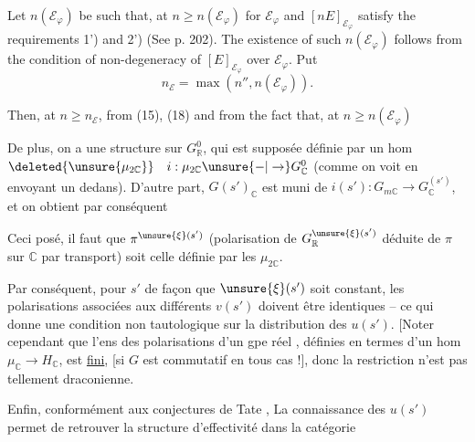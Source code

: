 Let $n(\mathcal E_{\varphi})$ be such that, at $n\geq n(\mathcal E_{\varphi})$ for $\mathcal E_{\varphi}$ and $[nE]_{\mathcal E_{\varphi}}$ satisfy the requirements 1') and 2') (See p. 202). The existence of such $n(\mathcal E_{\varphi})$ follows from the condition of non-degeneracy of $[E]_{\mathcal E_{\varphi}}$ over $\mathcal E_{\varphi}$. Put
\[
n_{\mathcal E}=\max(n'',n(\mathcal E_{\varphi})).
\]

Then, at $n\geq n_{\mathcal E}$, from (15), (18) and from the fact that, at $n\geq n(\mathcal E_{\varphi})$



De plus, on a une structure  \inserted{$\pi$} sur $G^0_{\mathbb R}$, qui est  supposée définie par un hom
$\deleted{\unsure{\mu_{2\mathbb C}}}\quad i:\mu_{2\mathbb C}\unsure{-|\to}G^0_{\mathbb C}$
(comme on voit en envoyant un   dedans). D'autre part, $G(s')_{\mathbb C}$ est muni de $i(s'):G_{m\mathbb C}\to G^{(s')}_{\mathbb C}$, et on obtient par conséquent
\diagram{\[
\begin{tikzcd}[column sep=large]
\unsure{v|v_q}(s')=u(s')_{\mathbb C}\circ(i(s')\mid\mu_2):\ \mu_{2\mathbb C} \arrow[r] & G^{\unsure{\xi}(s')}_{\mathbb C}
\end{tikzcd}
\]}

 Ceci posé, il faut que $\pi^{\unsure{\xi}(s')}$ (polarisation de $G^{\unsure{\xi}(s')}_{\mathbb R}$ déduite de $\pi$ sur $\mathbb C$ par transport) soit celle définie par les $\mu_{2\mathbb C}$.

Par conséquent, pour $s'$  de façon que $\unsure{\xi}(s')$ soit constant, les polarisations  associées aux différents $v(s')$ doivent être identiques -- ce qui donne une condition non tautologique sur la distribution des  $u(s')$. [Noter cependant que l'ens des  polarisations d'un gpe réel , définies en termes d'un hom $\mu_{\mathbb C}\to H_{\mathbb C}$, est \uline{fini}, [si $G$ est commutatif en tous cas !], donc la restriction n'est pas tellement draconienne.

Enfin, conformément aux conjectures de Tate , La connaissance des $u(s')$ permet de retrouver la structure d'effectivité dans la catégorie



